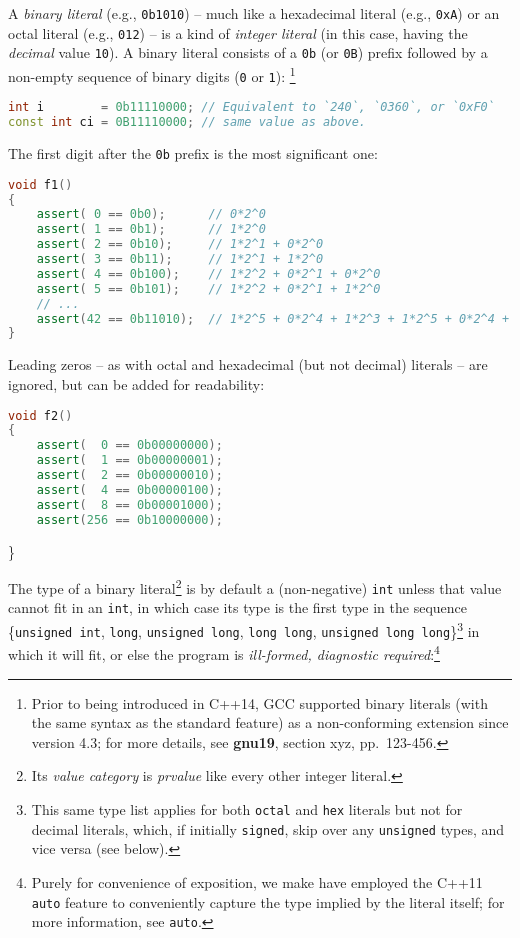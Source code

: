 \documentclass[twoside,10pt,letterpaper,usenames]{newstyle-PearsonGeneric-7-38}
\begin{document}
A \emph{binary literal} (e.g., \texttt{0b1010}) -- much like a
hexadecimal literal (e.g., \texttt{0xA}) or an octal literal (e.g.,
\texttt{012}) -- is a kind of \emph{integer literal} (in this case,
having the \emph{decimal} value \texttt{10}). A binary literal consists
of a \texttt{0b} (or \texttt{0B}) prefix followed by a non-empty
sequence of binary digits (\texttt{0} or \texttt{1}):
{\cprotect\footnote{Prior to being introduced in C++14, GCC supported
  binary literals (with the same syntax as the standard feature) as a
  non-conforming extension since version 4.3; for more details, see
  \textbf{gnu19}, section xyz, pp.~123-456.}}

\begin{lstlisting}[language=C++, caption={missing caption}, label={testlabel}, frame=tb]
int i        = 0b11110000; // Equivalent to `240`, `0360`, or `0xF0`
const int ci = 0B11110000; // same value as above.
\end{lstlisting}
    

The first digit after the \texttt{0b} prefix is the most significant
one:

\begin{lstlisting}[language=C++, caption={missing caption}, label={testlabel}, frame=tb]
void f1()
{
    assert( 0 == 0b0);      // 0*2^0
    assert( 1 == 0b1);      // 1*2^0
    assert( 2 == 0b10);     // 1*2^1 + 0*2^0
    assert( 3 == 0b11);     // 1*2^1 + 1*2^0
    assert( 4 == 0b100);    // 1*2^2 + 0*2^1 + 0*2^0
    assert( 5 == 0b101);    // 1*2^2 + 0*2^1 + 1*2^0
    // ...
    assert(42 == 0b11010);  // 1*2^5 + 0*2^4 + 1*2^3 + 1*2^5 + 0*2^4 + 1*2^3
}
\end{lstlisting}
    

Leading zeros -- as with octal and hexadecimal (but not decimal)
literals -- are ignored, but can be added for readability:

\begin{lstlisting}[language=C++, caption={missing caption}, label={testlabel}, frame=tb]
void f2()
{
    assert(  0 == 0b00000000);
    assert(  1 == 0b00000001);
    assert(  2 == 0b00000010);
    assert(  4 == 0b00000100);
    assert(  8 == 0b00001000);
    assert(256 == 0b10000000);
\end{lstlisting}
    

\}

The type of a binary literal{\cprotect\footnote{Its \emph{value
  category} is \emph{prvalue} like every other integer literal.}} is by
default a (non-negative) \texttt{int} unless that value cannot fit in an
\texttt{int}, in which case its type is the first type in the sequence
\{\texttt{unsigned int}, \texttt{long}, \texttt{unsigned long},
\texttt{long long}, \texttt{unsigned long long}\}{\cprotect\footnote{This
  same type list applies for both \texttt{octal} and \texttt{hex}
  literals but not for decimal literals, which, if initially
  \texttt{signed}, skip over any \texttt{unsigned} types, and vice versa
  (see below).}} in which it will fit, or else the program is
\emph{ill-formed, diagnostic required}:{\cprotect\footnote{Purely for
  convenience of exposition, we make have employed the C++11
  \texttt{auto} feature to conveniently capture the type implied by the
  literal itself; for more information, see \texttt{auto}.}}
\end{document}
